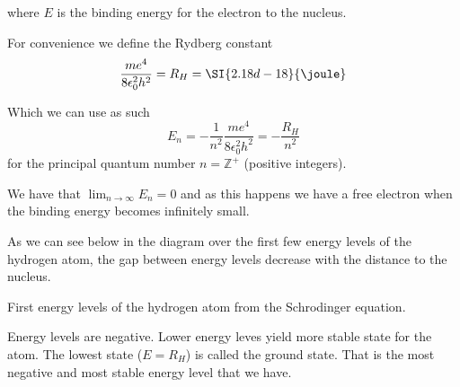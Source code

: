 \documentclass[../mit-general-chemistry.tex]{subfiles}
\begin{document}
where $E$ is the binding energy for the electron to the nucleus.

\begin{definition}
  For convenience we define the Rydberg constant
  \begin{equation}
    \frac{me^4}{8\epsilon_0^2h^2} = R_H = \SI{2.18d-18}{\joule}
  \end{equation}
\end{definition}

Which we can use as such
\begin{equation}
  E_n = -\frac{1}{n^2}\frac{me^4}{8\epsilon_0^2h^2}  = -\frac{R_H}{n^2}
\end{equation}
for the principal quantum number $n = \mathbb{Z}^+$ (positive
integers).

We have that $\lim_{n\to\infty} E_n = 0$ and as this happens we have a
free electron when the binding energy becomes infinitely small. 

As we can see below in the diagram over the first few energy levels of
the hydrogen atom, the gap between energy levels decrease with the
distance to the nucleus.

\begin{hfigure}
  \begin{center}
  \end{center}
  \caption{
    First energy levels of the hydrogen atom from the Schrodinger
    equation.
  }
\end{hfigure}

Energy levels are negative. Lower energy leves yield more stable state
for the atom. The lowest state ($E = R_H$) is called the ground
state. That is the most negative and most stable energy level that we
have.
\end{document}

